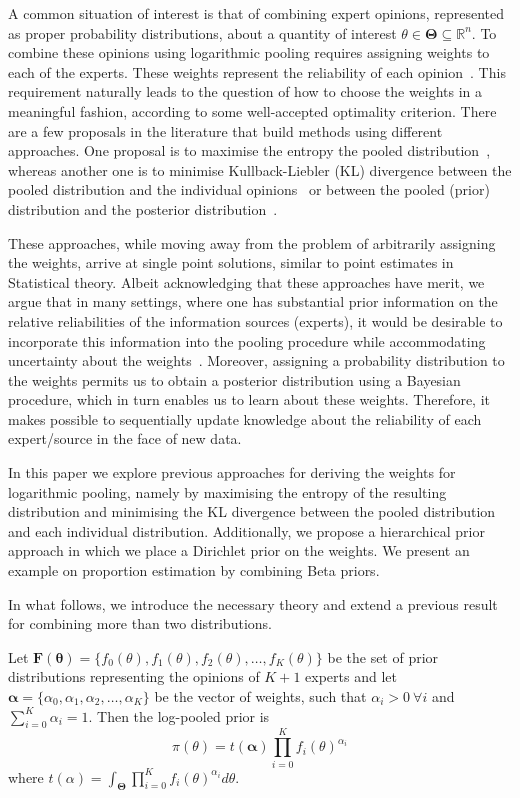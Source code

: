 \documentclass[a4paper, notitlepage, 10pt]{article}
\begin{document}
A common situation of interest is that of combining expert opinions, represented as proper probability distributions, about a quantity of interest $\theta \in \mathbf{\Theta} \subseteq \mathbb{R}^n$.
To combine these opinions using logarithmic pooling requires assigning weights to each of the experts.
These weights represent the reliability of each opinion~\citep{genest1984}.
This requirement naturally leads to the question of how to choose the weights in a meaningful fashion, according to some well-accepted optimality criterion.
There are a few proposals in the literature that build methods using different approaches.
One proposal is to maximise the entropy the pooled distribution~\citep{myung1996}, whereas another one is to minimise Kullback-Liebler (KL) divergence between the pooled distribution and the individual opinions~\citep{abbas2009} or between the pooled (prior) distribution and the posterior distribution~\citep{rufo2012A,rufo2012B}.

These approaches, while moving away from the problem of arbitrarily assigning the weights, arrive at single point solutions, similar to point estimates in Statistical theory.
Albeit acknowledging that these approaches have merit, we argue that in many settings, where one has substantial prior information on the relative reliabilities of the information sources (experts), it would be desirable to incorporate this information into the pooling procedure while accommodating uncertainty about the weights~\citep{poole2000}.
Moreover, assigning a probability distribution to the weights permits us to obtain a posterior distribution using a Bayesian procedure, which in turn enables us to learn about these weights.
Therefore, it makes possible to sequentially update knowledge about the reliability of each expert/source in the face of new data.

In this paper we explore previous approaches for deriving the weights for logarithmic pooling, namely by maximising the entropy of the resulting distribution and minimising the KL divergence between the pooled distribution and each individual distribution.
Additionally, we propose a hierarchical prior approach in which we place a Dirichlet prior on the weights.
We present an example on proportion estimation by combining Beta priors.

In what follows, we introduce the necessary theory and extend a previous 
result~\citep{poole2000} for combining more than two distributions.

Let $\mathbf{F(\theta)} = \{f_0(\theta), f_1(\theta), f_2(\theta), \ldots, f_K(\theta)\}$ be the set of prior distributions representing the opinions of $K+1$ experts and let $\boldsymbol\alpha =\{\alpha_0, \alpha_1, \alpha_2, \ldots, \alpha_K \}$ be the vector of weights, such that $\alpha_i > 0\: \forall i$ and $\sum_{i=0}^K \alpha_i = 1$.
Then the log-pooled prior is
\begin{equation}
\label{eq:logpool}
 \pi(\theta) = t(\boldsymbol\alpha) \prod_{i=0}^K f_i(\theta)^{\alpha_i} 
\end{equation}
where $t(\alpha) = \int_{\boldsymbol\Theta}\prod_{i=0}^K f_i(\theta)^{\alpha_i}d\theta$.
\end{document}
